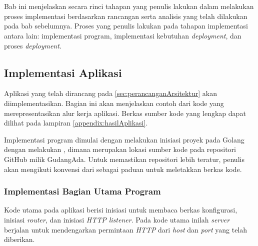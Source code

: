 \chapter{\babEmpat}
\label{bab:4}
Bab ini menjelaskan secara rinci tahapan yang penulis lakukan dalam melakukan
proses implementasi berdasarkan rancangan serta analisis yang telah dilakukan
pada bab sebelumnya. Proses yang penulis lakukan pada tahapan implementasi
antara lain: implementasi program, implementasi kebutuhan \textit{deployment}, dan
proses \textit{deployment}.

\section{Implementasi Aplikasi}
\label{sec:implementasiAplikasi}
Aplikasi yang telah dirancang pada \ref{sec:perancanganArsitektur} akan diimplementasikan. Bagian ini akan menjelaskan contoh dari kode yang merepresentasikan alur kerja aplikasi. Berkas sumber kode yang lengkap dapat dilihat pada lampiran \ref{appendix:hasilAplikasi}.

Implementasi program dimulai dengan melakukan inisiasi proyek pada Golang dengan melakukan , dimana  merupakan lokasi sumber kode pada repositori GitHub milik GudangAda. Untuk memastikan repositori lebih teratur, penulis akan mengikuti konvensi dari \cite{golang-standards_2022} sebagai paduan untuk meletakkan berkas kode.

\subsection{Implementasi Bagian Utama Program}
\label{sec:maingo}
Kode utama pada aplikasi berisi inisiasi untuk membaca berkas konfigurasi, inisiasi \textit{router}, dan inisiasi \textit{HTTP listener}. Pada kode utama inilah \textit{server} berjalan untuk mendengarkan permintaan \textit{HTTP} dari \textit{host} dan \textit{port} yang telah diberikan.

